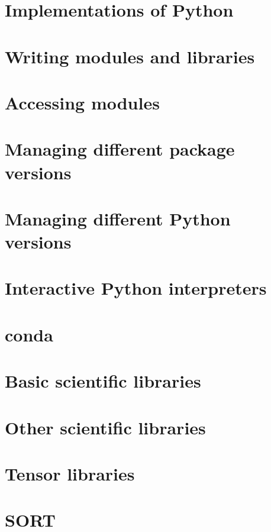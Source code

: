 \documentclass[oneside]{book}
\begin{document}
\part{Implementations of Python}


\part{Writing modules and libraries}



\part{Accessing modules}


\part{Managing different package versions}


\part{Managing different Python versions}


\part{Interactive Python interpreters}



\part{conda}


\part{Basic scientific libraries}





\part{Other scientific libraries}







\part{Tensor libraries}




\part{SORT}

\end{document}
